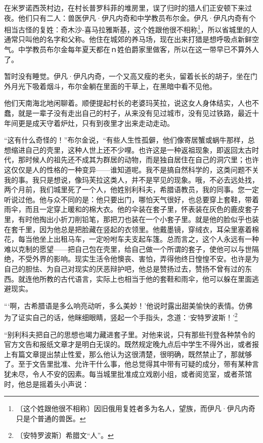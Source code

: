 \documentclass[12pt,UTF-8,openany]{ctexbook}
\begin{document}
\begin{large}
    
    在米罗诺西茨村边，在村长普罗科菲的堆房里，误了归时的猎人们正安顿下来过夜。他们只有二人：兽医伊凡·伊凡内奇和中学教员布尔金。伊凡·伊凡内奇有个相当古怪的复姓：奇木沙-喜马拉雅斯基，这个姓跟他很不相称\footnote{〔这个姓跟他很不相称〕因旧俄用复姓者多为名人，望族，而伊凡·伊凡内奇只是个普通的兽医。}，所以省城里的人通常只叫他的名字和父称。他住在城郊的养马场，现在出来打猎是想呼吸点新鲜空气。中学教员布尔金每年夏天都在ｎ姓伯爵家里做客，所以在这一带早已不算外人了。
    
    暂时没有睡觉。伊凡·伊凡内奇，一个又高又瘦的老头，留着长长的胡子，坐在门外月光下吸着烟斗，布尔金躺在里面的干草上，在黑暗中看不见他。
    
    他们天南海北地闲聊着。顺便提起村长的老婆玛芙拉，说这女人身体结实，人也不蠢，就是一辈子没有走出自己的村子，从来没有见过城市，没有见过铁路，最近十年间更是成天守着炉灶，只有到夜里才出来走动走动。
    
    “这有什么奇怪的！”布尔金说，“有些人生性孤僻，他们像寄居蟹或蜗牛那样，总想缩进自己的壳里，这种人世上还不少哩。也许这是一种返祖现象，即返回太古时代，那时候人的祖先还不成其为群居的动物，而是独自居住在自己的洞穴里；也许这仅仅是人的性格的一种变异——谁知道呢。我不是搞自然科学的，这类问题不关我的事。我只是想说，像玛芙拉这类人，并不是罕见的现象。哦，不必去远处找，两个月前，我们城里死了一个人，他姓别利科夫，希腊语教员，我的同事。您一定听说过他。他与众不同的是：他只要出门，哪怕天气很好，也总要穿上套鞋，带着雨伞，而且一定穿上暖和的棉大衣。他的伞装在套子里，怀表装在灰色的鹿皮套子里，有时他掏出小折刀削铅笔，那把刀也装在一个小套子里。就是他的脸似乎也装在套千里，因为他总是把脸藏在竖起的衣领里。他戴墨镜，穿绒衣，耳朵里塞着棉花，每当他坐上出租马车，一定吩咐车夫支起车篷。总而言之，这个人永远有一种难以克制的愿望——把自己包在壳里，给自己做一个所谓的套子，使他可以与世隔绝，不受外界的影响。现实生活令他懊丧、害怕，弄得他终日惶惶不安。也许是为自己的胆怯、为自己对现实的厌恶辩护吧，他总是赞扬过去，赞扬不曾有过的东西。就连他所教的古代语言，实际上也相当于他的套鞋和雨伞，他可以躲在里面逃避现实。
    
    “‘啊，古希腊语是多么响亮动听，多么美妙！’他说时露出甜美愉快的表情。仿佛为了证实自己的话，他眯细眼睛，竖起一个手指头，念道：‘安特罗波斯！’\footnote{〔安特罗波斯〕希腊文“人”。}
    
    “别利科夫把自己的思想也竭力藏进套子里。对他来说，只有那些刊登各种禁令的官方文告和报纸文章才是明白无误的。既然规定晚九点后中学生不得外出，或者报上有篇文章提出禁止性爱，那么他认为这很清楚，很明确，既然禁止了，那就够了。至于文告里批准、允许干什么事，他总觉得其中带有可疑的成分，带有某种言犹未尽，令人不安的因素。每当城里批准成立戏剧小组，或者阅览室，或者茶馆时，他总是摇着头小声说：
    

\end{large}
\end{document}
